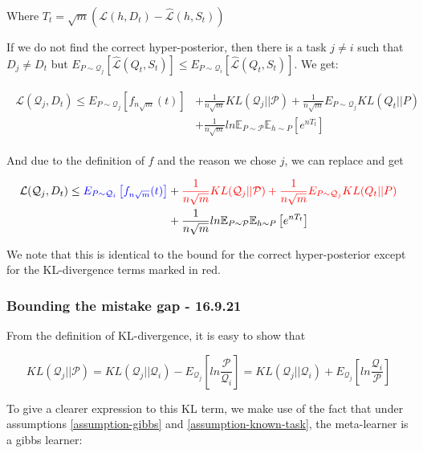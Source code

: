 \documentclass[letterpaper]{article}
\theoremstyle{definition}
\begin{document}
Where $T_t=\sqrt{m}(\mathcal{L}(h, D_t)-\hat{\mathcal{L}}(h,S_t))$

If we do not find the correct hyper-posterior, then there is a task $j\neq i$ such that $D_j\neq D_t$ but $E_{P\sim\mathcal{Q}_j}\left [\hat{\mathcal{L}}(Q_t, S_t)\right ]\leq E_{P\sim\mathcal{Q}_i}\left [\hat{\mathcal{L}}(Q_t, S_t)\right ]$. We get:

\begin{align*}
\begin{split}
\mathcal{L}(\mathcal{Q}_j, D_t)\leq E_{P\sim \mathcal{Q}_j} \left [ f_{n\sqrt{m}}(t)\right ] & + \frac{1}{n\sqrt{m}} KL(\mathcal{Q}_j||\mathcal{P}) +\frac{1}{n\sqrt{m}}E_{P\sim \mathcal{Q}_j} KL(Q_t||P) \\& + \frac{1}{n\sqrt{m}} ln\mathbb{E}_{P\sim \mathcal{P}}\mathbb{E}_{h\sim P}\left [ e^{nT_t} \right ]
\end{split}
\end{align*}

And due to the definition of $f$ and the reason we chose $j$, we can replace and get 

\begin{align*}
\begin{split}
\mathcal{L}(\mathcal{Q}_j, D_t)\leq \textcolor{blue}{E_{P\sim \mathcal{Q}_i} \left [ f_{n\sqrt{m}}(t)\right ]} & + \textcolor{red}{\frac{1}{n\sqrt{m}} KL(\mathcal{Q}_j||\mathcal{P}) +\frac{1}{n\sqrt{m}}E_{P\sim \mathcal{Q}_j} KL(Q_t||P)} \\&+ \frac{1}{n\sqrt{m}} ln\mathbb{E}_{P\sim \mathcal{P}}\mathbb{E}_{h\sim P}\left [ e^{nT_t} \right ]
\end{split}
\end{align*}

We note that this is identical to the bound for the correct hyper-posterior except for the KL-divergence terms marked in red.

\subsubsection*{Bounding the mistake gap - 16.9.21}


From the definition of KL-divergence, it is easy to show that

 $$KL(\mathcal{Q}_j||\mathcal{P})= KL(\mathcal{Q}_j||\mathcal{Q}_i)-E_{\mathcal{Q}_j}\left [ ln\frac{\mathcal{P}}{\mathcal{Q}_i}\right ]=KL(\mathcal{Q}_j||\mathcal{Q}_i)+E_{\mathcal{Q}_j}\left [ ln\frac{\mathcal{Q}_i}{\mathcal{P}}\right ]$$

To give a clearer expression to this KL term, we make use of the fact that under assumptions \ref{assumption-gibbs} and \ref{assumption-known-task}, the meta-learner is a gibbs learner:
\end{document}
